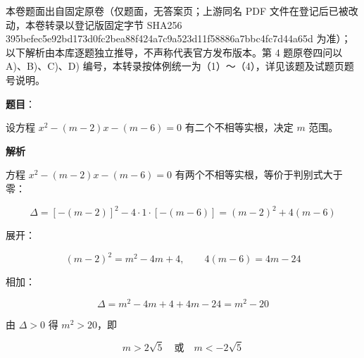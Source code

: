 

\begin{gktip}
本卷题面出自固定原卷（仅题面，无答案页；上游同名 PDF 文件在登记后已被改动，本卷转录以登记版固定字节 SHA256 395befec5e92bd173d0fc2bea88f424a7c9a523d11f58886a7bbc4fc7d44a65d 为准）；以下解析由本库逐题独立推导，不声称代表官方发布版本。第 4 题原卷四问以 A)、B)、C)、D) 编号，本转录按体例统一为（1）～（4），详见该题及试题页题号说明。
\end{gktip}

\begin{answer}

\textbf{题目}：

设方程 $x^{2}-(m-2)x-(m-6)=0$ 有二个不相等实根，决定 $m$ 范围。

\textbf{解析}

方程 $x^{2}-(m-2)x-(m-6)=0$ 有两个不相等实根，等价于判别式大于零：

\nopagebreak[4]
\[
\Delta=[-(m-2)]^2-4\cdot1\cdot[-(m-6)]=(m-2)^2+4(m-6)
\]

展开：

\nopagebreak[4]
\[
(m-2)^2=m^2-4m+4,\qquad 4(m-6)=4m-24
\]

相加：

\nopagebreak[4]
\[
\Delta=m^2-4m+4+4m-24=m^2-20
\]

由 $\Delta>0$ 得 $m^2>20$，即

\nopagebreak[4]
\[
m>2\sqrt5\quad\text{或}\quad m<-2\sqrt5
\]


\end{answer}
